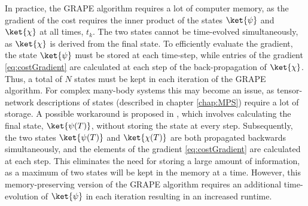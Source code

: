 In practice, the GRAPE algorithm requires a lot of computer memory, as the gradient of the cost requires the inner product of the states $\ket{\psi}$ and $\ket{\chi}$ at all times, $t_k$. The two states cannot be time-evolved simultaneously, as $\ket{\chi}$ is derived from the final state. To efficiently evaluate the gradient, the state $\ket{\psi}$ must be stored at each time-step, while entries of the gradient \eqref{eq:costGradient} are calculated at each step of the back-propagation of $\ket{\chi}$. Thus, a total of $N$ states must be kept in each iteration of the GRAPE algorithm. For complex many-body systems this may become an issue, as tensor-network descriptions of states (described in chapter \ref{chap:MPS}) require a lot of storage. A possible workaround is proposed in \cite{Mennemann2015}, which involves calculating the final state, $\ket{\psi (T)}$, without storing the state at every step. Subsequently, the two states $\ket{\psi (T)}$ and $\ket{\chi (T)}$ are both propagated backwards simultaneously, and the elements of the gradient \eqref{eq:costGradient} are calculated at each step. This eliminates the need for storing a large amount of information, as a maximum of two states will be kept in the memory at a time. However, this memory-preserving version of the GRAPE algorithm requires an additional time-evolution of $\ket{\psi}$ in each iteration resulting in an increased runtime.


